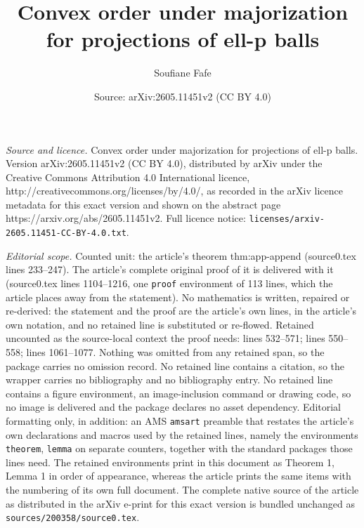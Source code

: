\documentclass[10pt,a4paper]{amsart}
\title{Convex order under majorization for projections of ell-p balls}
\author{Soufiane Fafe}
\date{Source: arXiv:2605.11451v2 (CC BY 4.0)}
\begin{document}
\maketitle

\noindent\emph{Source and licence.} Convex order under majorization for projections of ell-p balls. Version arXiv:2605.11451v2 (CC BY 4.0), distributed by arXiv under the Creative Commons Attribution 4.0 International licence, http://creativecommons.org/licenses/by/4.0/, as recorded in the arXiv licence metadata for this exact version and shown on the abstract page https://arxiv.org/abs/2605.11451v2. Full licence notice: \texttt{licenses/arxiv-2605.11451-CC-BY-4.0.txt}.\par\smallskip

\noindent\textit{Editorial scope.} Counted unit: the article's theorem thm:app-append (source0.tex lines 233--247). The article's complete original proof of it is delivered with it (source0.tex lines 1104--1216, one \texttt{proof} environment of 113 lines, which the article places away from the statement). No mathematics is written, repaired or re-derived: the statement and the proof are the article's own lines, in the article's own notation, and no retained line is substituted or re-flowed.  Retained uncounted as the source-local context the proof needs: lines 532--571; lines 550--558; lines 1061--1077.  Nothing was omitted from any retained span, so the package carries no omission record.  No retained line contains a citation, so the wrapper carries no bibliography and no bibliography entry.  No retained line contains a figure environment, an image-inclusion command or drawing code, so no image is delivered and the package declares no asset dependency.  Editorial formatting only, in addition: an AMS \texttt{amsart} preamble that restates the article's own declarations and macros used by the retained lines, namely the environments \texttt{theorem}, \texttt{lemma} on separate counters, together with the standard packages those lines need.  The retained environments print in this document as Theorem 1, Lemma 1 in order of appearance, whereas the article prints the same items with the numbering of its own full document.  The complete native source of the article as distributed in the arXiv e-print for this exact version is bundled unchanged as \texttt{sources/200358/source0.tex}.
\end{document}
